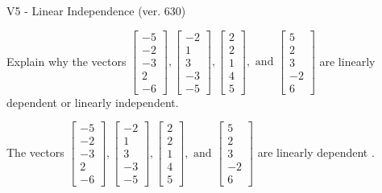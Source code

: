 \begin{exercise}
  \begin{exerciseTitle}V5 - Linear Independence (ver. 630)\end{exerciseTitle}
  \begin{exerciseStatement}
    Explain why the vectors \(\left[\begin{array}{r}
-5 \\
-2 \\
-3 \\
2 \\
-6
\end{array}\right] , \left[\begin{array}{r}
-2 \\
1 \\
3 \\
-3 \\
-5
\end{array}\right] , \left[\begin{array}{r}
2 \\
2 \\
1 \\
4 \\
5
\end{array}\right] , \text{ and } \left[\begin{array}{r}
5 \\
2 \\
3 \\
-2 \\
6
\end{array}\right]\) are linearly dependent or linearly independent.	


  \end{exerciseStatement}
  \begin{exerciseAnswer}
   The vectors \(\left[\begin{array}{r}
-5 \\
-2 \\
-3 \\
2 \\
-6
\end{array}\right] , \left[\begin{array}{r}
-2 \\
1 \\
3 \\
-3 \\
-5
\end{array}\right] , \left[\begin{array}{r}
2 \\
2 \\
1 \\
4 \\
5
\end{array}\right] , \text{ and } \left[\begin{array}{r}
5 \\
2 \\
3 \\
-2 \\
6
\end{array}\right]\) are 
  	 linearly dependent  .
  


  \end{exerciseAnswer}
\end{exercise}